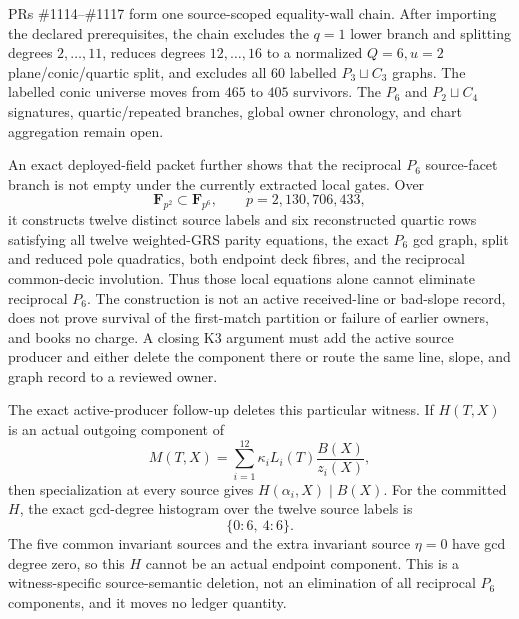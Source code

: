 \documentclass[11pt]{article}
\begin{document}
PRs \#1114--\#1117 form one source-scoped equality-wall chain.  After importing
the declared prerequisites, the chain excludes the \(q=1\) lower branch and
splitting degrees \(2,\ldots,11\), reduces degrees \(12,\ldots,16\) to a
normalized \(Q=6,u=2\) plane/conic/quartic split, and excludes all \(60\)
labelled \(P_3\sqcup C_3\) graphs.  The labelled conic universe moves from
\(465\) to \(405\) survivors.  The \(P_6\) and \(P_2\sqcup C_4\) signatures,
quartic/repeated branches, global owner chronology, and chart aggregation
remain open.

An exact deployed-field packet further shows that the reciprocal \(P_6\)
source-facet branch is not empty under the currently extracted local gates.
Over
\[
  \mathbf F_{p^2}\subset\mathbf F_{p^6},
  \qquad p=2{,}130{,}706{,}433,
\]
it constructs twelve distinct source labels and six reconstructed quartic
rows satisfying all twelve weighted-GRS parity equations, the exact \(P_6\)
gcd graph, split and reduced pole quadratics, both endpoint deck fibres, and
the reciprocal common-decic involution.  Thus those local equations alone
cannot eliminate reciprocal \(P_6\).  The construction is not an active
received-line or bad-slope record, does not prove survival of the first-match
partition or failure of earlier owners, and books no charge.  A closing K3
argument must add the active source producer and either delete the component
there or route the same line, slope, and graph record to a reviewed owner.

The exact active-producer follow-up deletes this particular witness.  If
\(H(T,X)\) is an actual outgoing component of
\[
  M(T,X)=\sum_{i=1}^{12}\kappa_iL_i(T)\frac{B(X)}{z_i(X)},
\]
then specialization at every source gives
\(H(\alpha_i,X)\mid B(X)\).  For the committed \(H\), the exact gcd-degree
histogram over the twelve source labels is
\[
  \{0:6,\ 4:6\}.
\]
The five common invariant sources and the extra invariant source
\(\eta=0\) have gcd degree zero, so this \(H\) cannot be an actual endpoint
component.  This is a witness-specific source-semantic deletion, not an
elimination of all reciprocal \(P_6\) components, and it moves no ledger
quantity.
\end{document}

